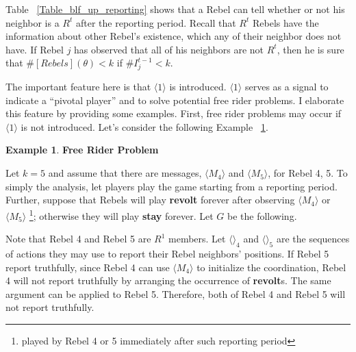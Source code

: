 \documentclass[12pt,letterpaper]{article}
\theoremstyle{definition}
\newtheorem{example}{Example}[section]
\theoremstyle{remark}
\theoremstyle{claim}
\begin{document}
Table ~\ref{Table_blf_up_reporting} shows that a Rebel can tell whether or not his neighbor is a $R^t$ after the reporting period. Recall that $R^t$ Rebels have the information about other Rebel's existence, which any of their neighbor does not have. If Rebel $j$ has observed that all of his neighbors are not $R^t$, then he is sure that $\#[Rebels](\theta)< k$ if $\#I^{t-1}_j<k$. 

The important feature here is that $\langle 1 \rangle$ is introduced. $\langle 1 \rangle$ serves as a signal to indicate a ``pivotal player'' and to solve potential free rider problems. I elaborate this feature by providing some examples. First, free rider problems may occur if $\langle 1 \rangle$ is not introduced. Let's consider the following Example ~\ref{ex_free_rider_tree}.

\begin{example} \label{ex_free_rider_tree}\textbf{Free Rider Problem}

Let $k=5$ and assume that there are messages, $\langle M_4 \rangle$ and $\langle M_5 \rangle$, for Rebel 4, 5. To simply the analysis, let players play the game starting from a reporting period. Further, suppose that Rebels will play \textbf{revolt} forever after observing $\langle M_4 \rangle$ or $\langle M_5 \rangle$ \footnote{played by Rebel 4 or 5 immediately after such reporting period}; otherwise they will play \textbf{stay} forever. Let $G$ be the following.

\begin{center}
\end{center}

Note that Rebel 4 and Rebel 5 are $R^1$ members. Let $\langle \rangle_4$ and $\langle \rangle_5$ are the sequences of actions they may use to report their Rebel neighbors' positions. If Rebel 5 report truthfully, since Rebel 4 can use $\langle M_4 \rangle$ to initialize the coordination, Rebel 4 will not report truthfully by arranging the occurrence of \textbf{revolt}s. The same argument can be applied to Rebel 5. Therefore, both of Rebel 4 and Rebel 5 will not report truthfully.

\end{example}
\end{document}
